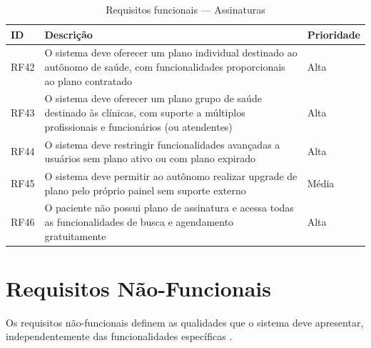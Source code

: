 \begin{table}[H]
  \centering
  \caption{Requisitos funcionais --- Assinaturas}
  \label{tab:subscription-requirements}
  \begin{tabular}{p{1.2cm}p{7cm}p{2cm}}
    \toprule
    \textbf{ID} &
    \textbf{Descrição} &
    \textbf{Prioridade} \\
    \midrule
    RF42 & O sistema deve oferecer um plano
           individual destinado ao autônomo
           de saúde, com funcionalidades
           proporcionais ao plano contratado
         & Alta \\
    RF43 & O sistema deve oferecer um plano
           grupo de saúde destinado às clínicas,
           com suporte a múltiplos profissionais
           e funcionários (ou atendentes)
         & Alta \\
    RF44 & O sistema deve restringir
           funcionalidades avançadas a usuários
           sem plano ativo ou com plano expirado
         & Alta \\
    RF45 & O sistema deve permitir ao autônomo
           realizar upgrade de plano pelo
           próprio painel sem suporte externo
         & Média \\
    RF46 & O paciente não possui plano de
           assinatura e acessa todas as
           funcionalidades de busca e
           agendamento gratuitamente
         & Alta \\
    \bottomrule
  \end{tabular}
\end{table}

\section{Requisitos Não-Funcionais}
\label{sec:non-functional-requirements}

Os requisitos não-funcionais definem as qualidades
que o sistema deve apresentar, independentemente
das funcionalidades específicas \cite{sommerville2011}.


